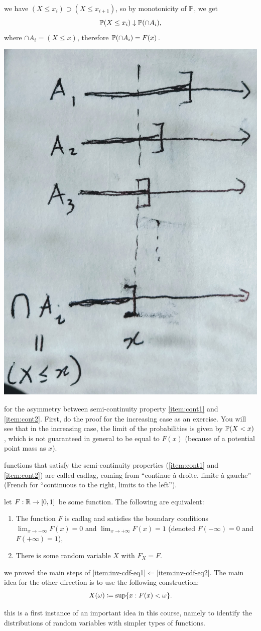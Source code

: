 \documentclass{article}
\begin{document}
 we have $(X \le x_i) \supset (X \le x_{i+1})$, so by monotonicity of $\P$, we get
\[ \P(X \le x_i) \downarrow \P(\cap A_i), \]
where $\cap A_i = (X \le x)$, therefore $\P(\cap A_i) = F(x)$.
\begin{center}
	\includegraphics[width=0.3\linewidth]{figures/limit-cdf}
\end{center}

 for the asymmetry between semi-continuity property \ref{item:cont1} and \ref{item:cont2}. First, do the proof for the increasing case as an exercise. You will see that in the increasing case, the limit of the probabilities is given by $\P(X < x)$, which is not guaranteed in general to be equal to $F(x)$ (because of a potential point mass as $x$).

 functions that satisfy the semi-continuity properties (\ref{item:cont1} and \ref{item:cont2}) are called cadlag, coming from ``continue \`a droite, limite \`a gauche'' (French for ``continuous to the right, limits to the left'').

 let $F : \R \to [0, 1]$ be some function. The following are equivalent:
\begin{enumerate}
  \item \label{item:inv-cdf-eq1} The function $F$ is cadlag and satisfies the boundary conditions $\lim_{x \to -\infty} F(x) = 0$ and $\lim_{x \to +\infty} F(x) = 1$ (denoted $F(-\infty) = 0$ and $F(+\infty) = 1$),
  \item \label{item:inv-cdf-eq2} There is some random variable $X$ with $F_X = F$.
\end{enumerate}

 we proved the main steps of \ref{item:inv-cdf-eq1}$\Longleftarrow$\ref{item:inv-cdf-eq2}. The main idea for the other direction is to use the following construction:
\[ X(\omega) \defeq \sup\{x : F(x) < \omega\}. \]

 this is a first instance of an important idea in this course, namely to identify the distributions of random variables with simpler types of functions.
\end{document}
